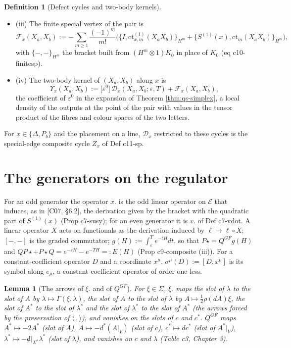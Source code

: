 \documentclass[11pt]{article}
\numberwithin{equation}{section}
\theoremstyle{plain}
\newtheorem{lemma}[theorem]{Lemma}
\theoremstyle{definition}
\newtheorem{definition}[theorem]{Definition}
\begin{document}
\begin{definition}[Defect cycles and two-body kernels]
\begin{itemize}
\item (iii) The finite special vertex of the pair is
\begin{equation}
\mathcal F_x(X_a,X_b):=-\sum_{m\ge1}\frac{(-1)^m}{m!}\Big(\big\{I,\mathrm{ct}^{(1)}_{x,m}(X_aX_b)\big\}_{H^m}+\big\{S^{(1)}(x),\mathrm{ct}_m(X_aX_b)\big\}_{H^m}\Big),
\label{eq:qs-finitesp}
\end{equation}
with $\{-,-\}_{H^m}$ the bracket built from $(H^m\otimes1)K_0$ in place of $K_0$ (eq c10-finitesp).
\item (iv) The two-body kernel of $(X_a,X_b)$ along $x$ is
\begin{equation}
\Upsilon_x(X_a,X_b):=\big[\varepsilon^0\big]\,\mathcal D_x(X_a,X_b;\varepsilon,T)+\mathcal F_x(X_a,X_b),
\label{eq:qs-kernel}
\end{equation}
the coefficient of $\varepsilon^0$ in the expansion of Theorem \ref{thm:qs-simplex}, a local density of the outputs at the point of the pair with values in the tensor product of the fibres and colour spaces of the two letters.
\end{itemize}
For $x\in\{\Delta,P_b\}$ and the placement on a line, $\mathcal D_x$ restricted to these cycles is the special-edge composite cycle $Z_x$ of Def c11-sp.
\end{definition}

\section{The generators on the regulator}
\label{sec:qs-reg}

For an odd generator the operator $x.$ is the odd linear operator on $\mathscr E$ that induces, as in [C07, §6.2], the derivation given by the bracket with the quadratic part of $S^{(1)}(x)$ (Prop c7-susy); for an even generator it is $v.$ of Def c7-vdot. A linear operator $X$ acts on functionals as the derivation induced by $\ell\mapsto\ell\circ X$; $[-,-]$ is the graded commutator; $g(H):=\int_\varepsilon^Te^{-tH}dt$, so that $P\star=Q^{GF}g(H)$ and $QP\star+P\star Q=e^{-\varepsilon H}-e^{-TH}=:E(H)$ (Prop c9-composite (iii)). For a constant-coefficient operator $D$ and a coordinate $x^\mu$, $\sigma^\mu(D):=[D,x^\mu]$ is its symbol along $e_\mu$, a constant-coefficient operator of order one less.

\begin{lemma}[The arrows of $\xi.$ and of $Q^{GF}$]
\label{lem:qs-arrows}
For $\xi\in\Sigma$, $\xi.$ maps the slot of $\lambda$ to the slot of $A$ by $\lambda\mapsto\Gamma(\xi,\lambda)$, the slot of $A$ to the slot of $\lambda$ by $A\mapsto\tfrac12\rho(dA)\xi$, the slot of $A^*$ to the slot of $\lambda^*$ and the slot of $\lambda^*$ to the slot of $A^*$ (the arrows forced by the preservation of $\langle\,,\rangle$), and vanishes on the slots of $c$ and $c^*$. $Q^{GF}$ maps $A^*\mapsto-2A^*$ (slot of $A$), $A\mapsto-d^*(A|_V)$ (slot of $c$), $c^*\mapsto dc^*$ (slot of $A^*|_V$), $\lambda^*\mapsto-{\not d}|_{\Sigma^*}\lambda^*$ (slot of $\lambda$), and vanishes on $c$ and $\lambda$ (Table c3, Chapter 3).
\end{lemma}
\end{document}
